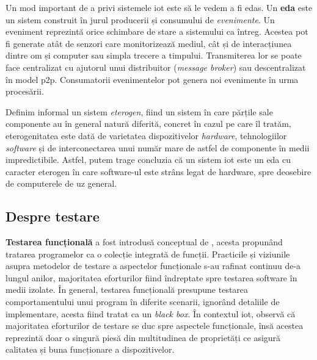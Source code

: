 

Un mod important de a privi sistemele \acrshort{iot} este să le vedem a fi \acrfull{edas}. Un \textbf{\acrshort{eda}} este un sistem construit în jurul producerii și consumului de \emph{evenimente}. Un eveniment reprezintă orice schimbare de stare a sistemului ca întreg. Acestea pot fi generate atât de senzori care monitorizează mediul, cât și de interacțiunea dintre om și computer sau simpla trecere a timpului. Transmiterea lor se poate face centralizat cu ajutorul unui distribuitor (\textit{message broker}) sau descentralizat în model \acrfull{p2p}. Consumatorii evenimentelor pot genera noi evenimente în urma procesării.

Definim informal un sistem \emph{eterogen}, fiind un sistem în care părțile sale componente au în general natură diferită, concret în cazul pe care îl tratăm, eterogenitatea este dată de varietatea dispozitivelor \emph{hardware}, tehnologiilor \emph{software} și de interconectarea unui număr mare de astfel de componente în medii impredictibile. Astfel, putem trage concluzia că un sistem \acrshort{iot} este un \acrshort{eda} cu caracter eterogen în care software-ul este strâns legat de hardware, spre deosebire de computerele de uz general. 


\subsection*{Despre testare}


\textbf{Testarea funcțională} a fost introdusă conceptual de \citet{Howden1980}, acesta propunând tratarea programelor ca o colecție integrată de funcții. Practicile și viziunile asupra metodelor de testare a aspectelor funcționale s-au rafinat continuu de-a lungul anilor, majoritatea eforturilor fiind îndreptate spre testarea software în medii izolate. În general, testarea funcțională presupune testarea comportamentului unui program în diferite scenarii, ignorând detaliile de implementare, acesta fiind tratat ca un \textit{black box}. În contextul \acrshort{iot}, \citet{Corts2019} observă că majoritatea eforturilor de testare se duc spre aspectele funcționale, însă acestea reprezintă doar o singură piesă din multitudinea de proprietăți ce asigură calitatea și buna funcționare a dispozitivelor.

